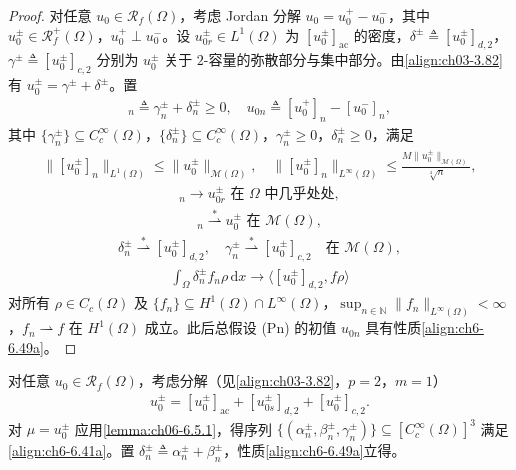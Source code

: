 \documentclass[../../main.tex]{subfiles}%
\begin{document}
\begin{proof}
对任意 $u_0\in\mathscr{R}_f(\Omega)$，考虑 Jordan 分解 $u_0=u^+_0-u^-_0$，其中 $u^\pm_0\in\mathscr{R}^+_f(\Omega)$，$u^+_0\perp u^-_0$。设 $u^\pm_{0r}\in L^1(\Omega)$ 为 $[u^\pm_0]_{\mathrm{ac}}$ 的密度，$\delta^\pm\triangleq [u^\pm_0]_{d,2}$，$\gamma^\pm\triangleq [u^\pm_0]_{c,2}$ 分别为 $u^\pm_0$ 关于 $2$-容量的弥散部分与集中部分。由\eqref{align:ch03-3.82}有 $u^\pm_0=\gamma^\pm+\delta^\pm$。置
\begin{align}
[u^\pm_0]_n\triangleq \gamma^\pm_n+\delta^\pm_n\geqslant0,\quad
u_{0n}\triangleq [u^+_0]_n-[u^-_0]_n, \label{align:ch6-6.48}
\end{align}
其中 $\{\gamma^\pm_n\}\subseteq C^\infty_c(\Omega)$，$\{\delta^\pm_n\}\subseteq C^\infty_c(\Omega)$，$\gamma^\pm_n\geqslant0$，$\delta^\pm_n\geqslant0$，满足
\begin{align}
\|[u^\pm_0]_n\|_{L^1(\Omega)}\leqslant\|u^\pm_0\|_{\mathscr{M}(\Omega)},\quad
\|[u^\pm_0]_n\|_{L^\infty(\Omega)}\leqslant\frac{M\|u^\pm_0\|_{\mathscr{M}(\Omega)}}{\sqrt[4]{n}}, \label{align:ch6-6.49a}
\end{align}
\begin{align}
[u^\pm_0]_n\to u^\pm_{0r} \text{ 在 }\Omega\text{ 中几乎处处}, \label{align:ch6-6.49b}
\end{align}
\begin{align}
[u^\pm_0]_n\stackrel{*}{\rightharpoonup}u^\pm_0 \text{ 在 }\mathscr{M}(\Omega), \label{align:ch6-6.49c}
\end{align}
\begin{align}
\delta^\pm_n\stackrel{*}{\rightharpoonup}[u^\pm_0]_{d,2},\quad
\gamma^\pm_n\stackrel{*}{\rightharpoonup}[u^\pm_0]_{c,2}
\quad\text{在 }\mathscr{M}(\Omega), \label{align:ch6-6.49d}
\end{align}
\begin{align}
\int_\Omega\delta^\pm_n f_n\rho\,\mathrm{d}x\to\langle[u^\pm_0]_{d,2},f\rho\rangle \label{align:ch6-6.49e}
\end{align}
对所有 $\rho\in C_c(\Omega)$ 及 $\{f_n\}\subseteq H^1(\Omega)\cap L^\infty(\Omega)$，$\sup_{n\in\mathbb{N}}\|f_n\|_{L^\infty(\Omega)}<\infty$，$f_n\rightharpoonup f$ 在 $H^1(\Omega)$ 成立。此后总假设 (Pn) 的初值 $u_{0n}$ 具有性质\eqref{align:ch6-6.49a}。
\end{proof}

\begin{remark}\label{remark:ch06-6.5.1}
对任意 $u_0\in\mathscr{R}_f(\Omega)$，考虑分解（见\eqref{align:ch03-3.82}，$p=2$，$m=1$）
\begin{align}
u^\pm_0=[u^\pm_0]_{\mathrm{ac}}+[u^\pm_{0s}]_{d,2}+[u^\pm_0]_{c,2}. \label{align:ch6-6.50}
\end{align}
对 $\mu=u^\pm_0$ 应用\cref{lemma:ch06-6.5.1}，得序列 $\{(\alpha^\pm_n,\beta^\pm_n,\gamma^\pm_n)\}\subseteq[C^\infty_c(\Omega)]^3$ 满足\eqref{align:ch6-6.41a}。置 $\delta^\pm_n\triangleq \alpha^\pm_n+\beta^\pm_n$，性质\eqref{align:ch6-6.49a}立得。
\end{remark}
\end{document}
